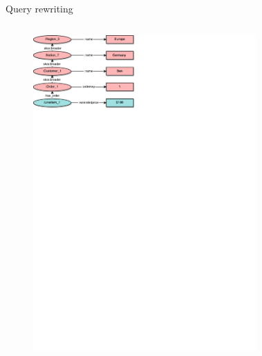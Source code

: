\begin{frame}[fragile]{Query rewriting}
\begin{columns}
\centering
\begin{figure}
    \includegraphics[trim=0 648 280 0,clip,width=1\textwidth]{images/snowflakepattern-0.pdf}
\end{figure}
\centering
\begin{figure}

\end{figure}
\end{columns}
\end{frame}
